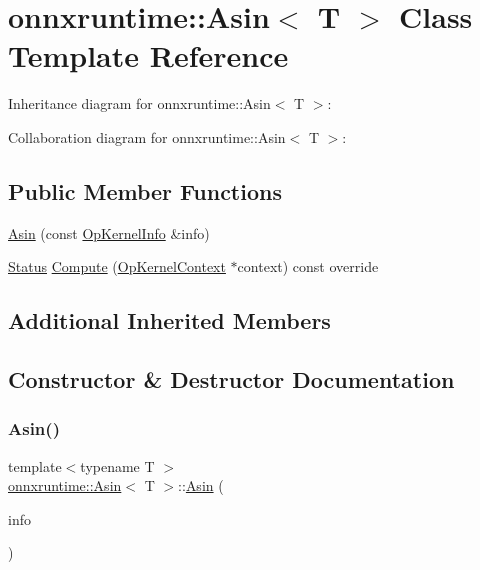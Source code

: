 \hypertarget{classonnxruntime_1_1Asin}{}\section{onnxruntime\+:\+:Asin$<$ T $>$ Class Template Reference}
\label{classonnxruntime_1_1Asin}


Inheritance diagram for onnxruntime\+:\+:Asin$<$ T $>$\+:


Collaboration diagram for onnxruntime\+:\+:Asin$<$ T $>$\+:
\subsection*{Public Member Functions}
\begin{DoxyCompactItemize}
\item 
\mbox{\hyperlink{classonnxruntime_1_1Asin_a02d90be67cf8ad8d965bf1cd754d9b5e}{Asin}} (const \mbox{\hyperlink{classonnxruntime_1_1OpKernelInfo}{Op\+Kernel\+Info}} \&info)
\item 
\mbox{\hyperlink{classonnxruntime_1_1common_1_1Status}{Status}} \mbox{\hyperlink{classonnxruntime_1_1Asin_aebed831576b92a58720e731a37be2035}{Compute}} (\mbox{\hyperlink{classonnxruntime_1_1OpKernelContext}{Op\+Kernel\+Context}} $\ast$context) const override
\end{DoxyCompactItemize}
\subsection*{Additional Inherited Members}


\subsection{Constructor \& Destructor Documentation}
\mbox{\label{classonnxruntime_1_1Asin_a02d90be67cf8ad8d965bf1cd754d9b5e}} 
\subsubsection{\texorpdfstring{Asin()}{Asin()}}
{\footnotesize\ttfamily template$<$typename T $>$ \\
\mbox{\hyperlink{classonnxruntime_1_1Asin}{onnxruntime\+::\+Asin}}$<$ T $>$\+::\mbox{\hyperlink{classonnxruntime_1_1Asin}{Asin}} (\begin{DoxyParamCaption}\item[{const \mbox{\hyperlink{classonnxruntime_1_1OpKernelInfo}{Op\+Kernel\+Info}} \&}]{info }\end{DoxyParamCaption})\hspace{0.3cm}{\ttfamily [inline]}}



